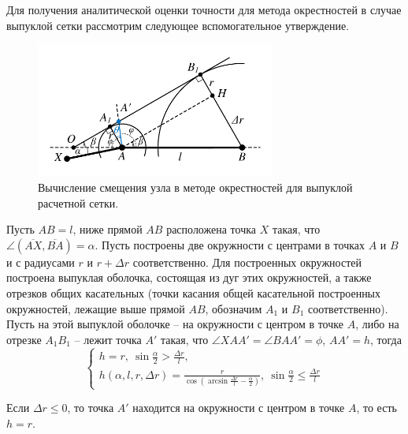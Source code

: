 Для получения аналитической оценки точности для метода окрестностей в случае выпуклой сетки рассмотрим следующее вспомогательное утверждение.

\begin{figure}[ht]
\centering
\includegraphics[width=0.7\textwidth]{fig/2dr_accuracy_okrestnost.pdf}
\singlespacing
{}\caption{Вычисление смещения узла в методе окрестностей для выпуклой расчетной сетки.}
\label{fig:text_1_remesh_2d_accuracy_okrestnost}
\end{figure}

\begin{lemma}\label{lem:text_1_remesh_2d_accuracy_okrestnost}
Пусть $AB = l$, ниже прямой $AB$ расположена точка $X$ такая, что $\angle (\overline{AX}, \overline{BA}) = \alpha$.
Пусть построены две окружности с центрами в точках $A$ и $B$ и с радиусами $r$ и $r + \Delta r$ соответственно.
Для построенных окружностей построена выпуклая оболочка, состоящая из дуг этих окружностей, а также отрезков общих касательных (точки касания общей касательной построенных окружностей, лежащие выше прямой $AB$, обозначим $A_1$ и $B_1$ соответственно).
Пусть на этой выпуклой оболочке -- на окружности с центром в точке $A$, либо на отрезке $A_1B_1$ -- лежит точка $A'$ такая, что $\angle XAA' = \angle BAA' = \phi$, $AA' = h$, тогда 
\begin{equation}
	\begin{cases}\label{eqn:text_1_remesh_2d_okr_h}
		h = r, \  \sin \frac{\alpha}{2} > \frac{\Delta r}{l}, \\
		h(\alpha, l, r, \Delta r) = \frac{r}{\cos \left( \arcsin \frac{\Delta r}{l} - \frac{\alpha}{2} \right)}, \  \sin \frac{\alpha}{2} \le \frac{\Delta r}{l}
	\end{cases}
\end{equation}
\end{lemma}

Если $\Delta r \le 0$, то точка $A'$ находится на окружности с центром в точке $A$, то есть $h = r$.

